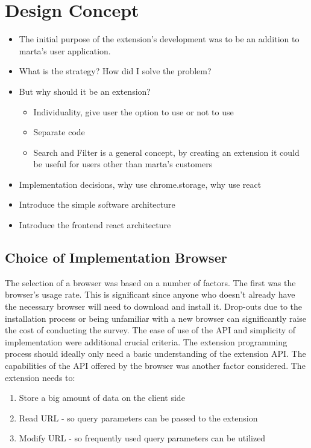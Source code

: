 \section{Design Concept}
\begin{itemize}
  \item The initial purpose of the extension's development was to be an addition to marta's user application.
  \item What is the strategy? How did I solve the problem?
  \item But why should it be an extension?
        \begin{itemize}
          \item Individuality, give user the option to use or not to use
          \item Separate code
          \item Search and Filter is a general concept, by creating an extension it could be useful for users other than marta's customers
        \end{itemize}
  \item Implementation decisions, why use chrome.storage, why use react
  \item Introduce the simple software architecture
  \item Introduce the frontend react architecture
\end{itemize}

\subsection{Choice of Implementation Browser}
The selection of a browser was based on a number of factors. The first was the browser's usage rate. This is significant since anyone who doesn't already have the necessary browser will need to download and install it. Drop-outs due to the installation process or being unfamiliar with a new browser can significantly raise the cost of conducting the survey. The ease of use of the API and simplicity of implementation were additional crucial criteria. The extension programming process should ideally only need a basic understanding of the extension API. The capabilities of the API offered by the browser was another factor considered. The extension needs to:

\begin{enumerate}
  \item Store a big amount of data on the client side
  \item Read URL - so query parameters can be passed to the extension
  \item Modify URL - so frequently used query parameters can be utilized
\end{enumerate}

